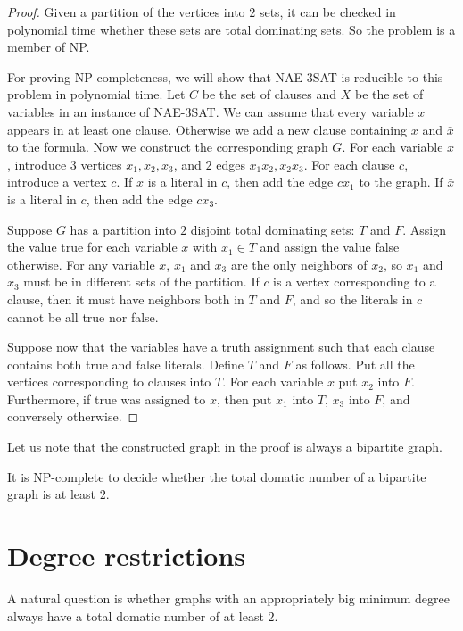 \begin{proof}
  Given a partition of the vertices into $2$ sets, it can be checked in polynomial
  time whether these sets are total dominating sets. So the problem is a member
  of NP.

  For proving NP-completeness, we will show that NAE-3SAT is reducible to this problem
  in polynomial time. Let $C$ be the set of clauses and $X$ be the set of variables
  in an instance of NAE-3SAT. We can assume that every variable $x$ appears in at least
  one clause. Otherwise we add a new clause containing $x$ and $\bar{x}$ to
  the formula. Now we construct the corresponding graph $G$. For each variable $x$,
  introduce $3$ vertices $x_1, x_2, x_3$, and $2$ edges $x_1x_2, x_2x_3$. For each
  clause $c$, introduce a vertex $c$. If $x$ is a literal in $c$, then add the edge
  $cx_1$ to the graph. If $\bar{x}$ is a literal in $c$, then add the edge $cx_3$.

  Suppose $G$ has a partition into $2$ disjoint total dominating sets: $T$ and $F$.
  Assign the value true for each variable $x$ with $x_1 \in T$ and assign the value
  false otherwise. For any variable $x$, $x_1$ and $x_3$ are the only neighbors
  of $x_2$, so $x_1$ and $x_3$ must be in different sets of the partition. If $c$
  is a vertex corresponding to a clause, then it must have neighbors both in $T$
  and $F$, and so the literals in $c$ cannot be all true nor false.

  Suppose now that the variables have a truth assignment such that each clause
  contains both true and false literals. Define $T$ and $F$ as follows. Put all
  the vertices corresponding to clauses into $T$. For each variable $x$ put $x_2$
  into $F$. Furthermore, if true was assigned to $x$, then put $x_1$ into $T$, $x_3$
  into $F$, and conversely otherwise.
\end{proof}

Let us note that the constructed graph in the proof is always a bipartite
graph.

\begin{cor}
  It is NP-complete to decide whether the total domatic number of
  a bipartite graph is at least $2$.
\end{cor}


\section{Degree restrictions}

A natural question is whether graphs with an appropriately big minimum degree
always have a total domatic number of at least $2$.

